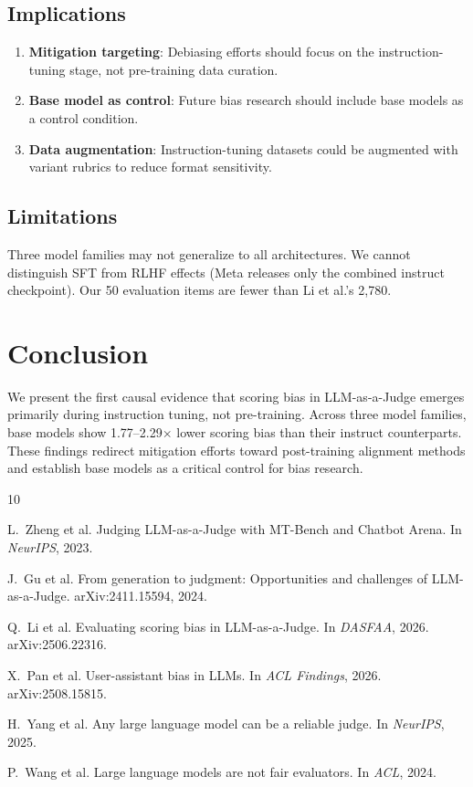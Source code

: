 \documentclass[11pt,twocolumn]{article}
\begin{document}
\subsection{Implications}

\begin{enumerate}
    \item \textbf{Mitigation targeting}: Debiasing efforts should focus on the instruction-tuning stage, not pre-training data curation.
    \item \textbf{Base model as control}: Future bias research should include base models as a control condition.
    \item \textbf{Data augmentation}: Instruction-tuning datasets could be augmented with variant rubrics to reduce format sensitivity.
\end{enumerate}

\subsection{Limitations}

Three model families may not generalize to all architectures. We cannot distinguish SFT from RLHF effects (Meta releases only the combined instruct checkpoint). Our 50 evaluation items are fewer than Li et al.'s 2,780.

\section{Conclusion}

We present the first causal evidence that scoring bias in LLM-as-a-Judge emerges primarily during instruction tuning, not pre-training. Across three model families, base models show 1.77--2.29$\times$ lower scoring bias than their instruct counterparts. These findings redirect mitigation efforts toward post-training alignment methods and establish base models as a critical control for bias research.

\begin{thebibliography}{10}

L.~Zheng et al.
Judging LLM-as-a-Judge with MT-Bench and Chatbot Arena.
In \textit{NeurIPS}, 2023.

J.~Gu et al.
From generation to judgment: Opportunities and challenges of LLM-as-a-Judge.
arXiv:2411.15594, 2024.

Q.~Li et al.
Evaluating scoring bias in LLM-as-a-Judge.
In \textit{DASFAA}, 2026. arXiv:2506.22316.

X.~Pan et al.
User-assistant bias in LLMs.
In \textit{ACL Findings}, 2026. arXiv:2508.15815.

H.~Yang et al.
Any large language model can be a reliable judge.
In \textit{NeurIPS}, 2025.

P.~Wang et al.
Large language models are not fair evaluators.
In \textit{ACL}, 2024.

\end{thebibliography}
\end{document}

